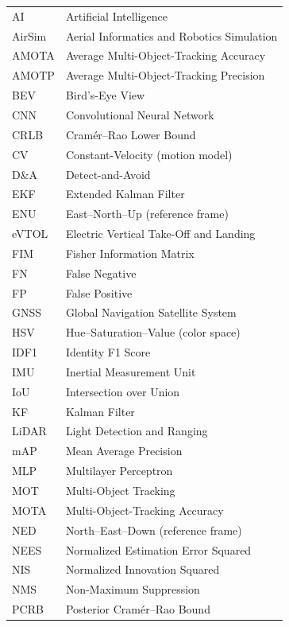 \begin{longtable}{ll}
AI      & Artificial Intelligence \\
AirSim  & Aerial Informatics and Robotics Simulation \\
AMOTA   & Average Multi-Object-Tracking Accuracy \\
AMOTP   & Average Multi-Object-Tracking Precision \\
BEV     & Bird's-Eye View \\
CNN     & Convolutional Neural Network \\
CRLB    & Cram\'er--Rao Lower Bound \\
CV      & Constant-Velocity (motion model) \\
D\&A    & Detect-and-Avoid \\
EKF     & Extended Kalman Filter \\
ENU     & East--North--Up (reference frame) \\
eVTOL   & Electric Vertical Take-Off and Landing \\
FIM     & Fisher Information Matrix \\
FN      & False Negative \\
FP      & False Positive \\
GNSS    & Global Navigation Satellite System \\
HSV     & Hue--Saturation--Value (color space) \\
IDF1    & Identity F1 Score \\
IMU     & Inertial Measurement Unit \\
IoU     & Intersection over Union \\
KF      & Kalman Filter \\
LiDAR   & Light Detection and Ranging \\
mAP     & Mean Average Precision \\
MLP     & Multilayer Perceptron \\
MOT     & Multi-Object Tracking \\
MOTA    & Multi-Object-Tracking Accuracy \\
NED     & North--East--Down (reference frame) \\
NEES    & Normalized Estimation Error Squared \\
NIS     & Normalized Innovation Squared \\
NMS     & Non-Maximum Suppression \\
PCRB    & Posterior Cram\'er--Rao Bound \\

\end{longtable}
